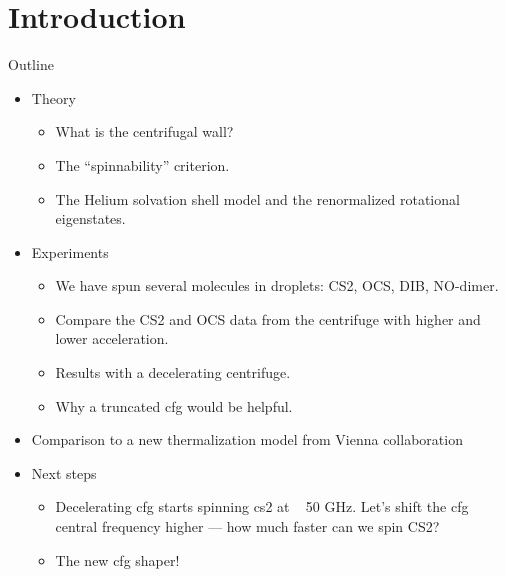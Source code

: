 \section{Introduction}

\begin{frame}{Outline}
  \begin{itemize}
    \item Theory
      \begin{itemize}
        \item What is the centrifugal wall?
        \item The ``spinnability'' criterion.
        \item The Helium solvation shell model and the renormalized rotational eigenstates.
      \end{itemize}
    \item Experiments
      \begin{itemize}
        \item We have spun several molecules in droplets: CS2, OCS, DIB, NO-dimer. 
        \item Compare the CS2 and OCS data from the centrifuge with higher and lower acceleration. 
        \item Results with a decelerating centrifuge. 
        \item Why a truncated cfg would be helpful.
      \end{itemize}
    \item Comparison to a new thermalization model from Vienna collaboration
    \item Next steps
      \begin{itemize}
        \item Decelerating cfg starts spinning cs2 at ~ 50 GHz. Let's shift the cfg central frequency higher --- how much faster can we spin CS2?
        \item The new cfg shaper!
      \end{itemize}
  \end{itemize}
\end{frame}
